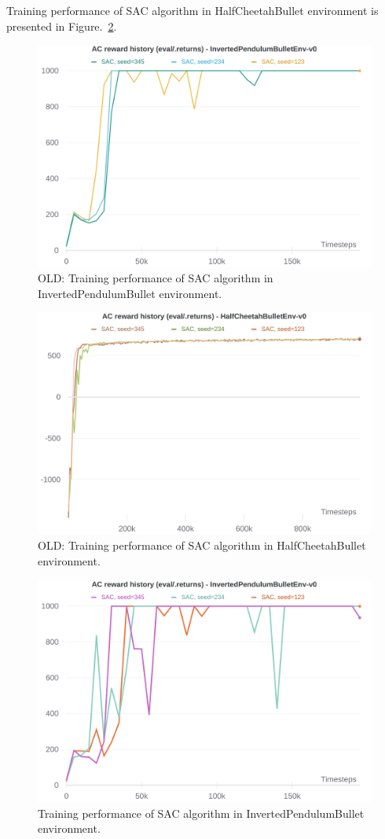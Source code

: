 \documentclass[12pt]{article}
\begin{document}
Training performance of SAC algorithm in HalfCheetahBullet environment is presented in Figure.~\ref*{fig:fig6}.
\newline


\pagebreak

\begin{figure}[pht] 
	\centering  %
    \includegraphics[width=0.65\columnwidth]{img/Figure_5_WB_InvertedPendulumBullet_SAC.png}
	\caption{OLD: Training performance of SAC algorithm in InvertedPendulumBullet environment.}
	\label{fig:fig5}
\end{figure}

\begin{figure}[phb] 
	\centering  %
    \includegraphics[width=0.65\columnwidth]{img/Figure_6_WB_HalfCheetahBullet_SAC.png}
	\caption{OLD: Training performance of SAC algorithm in HalfCheetahBullet environment.}
	\label{fig:fig6}
\end{figure}

\pagebreak

\begin{figure}[pht] 
	\centering  %
    \includegraphics[width=0.65\columnwidth]{img/Figure_7_WB_InvertedPendulumBullet_SAC.png}
	\caption{Training performance of SAC algorithm in InvertedPendulumBullet environment.}
	\label{fig:fig7}
\end{figure}
\end{document}
